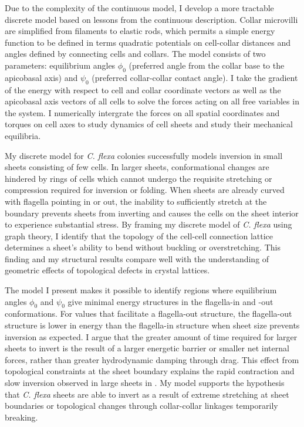 Due to the complexity of the continuous model, I develop a more tractable discrete model based on lessons from the continuous description. 
Collar microvilli are simplified from filaments to elastic rods, which permits a simple energy function to be defined in terms quadratic potentials on cell-collar distances and angles defined by connecting cells and collars.
The model consists of two parameters: equilibrium angles $\phi_0$ (preferred angle from the collar base to the apicobasal axis) and $\psi_0$ (preferred collar-collar contact angle). 
I take the gradient of the energy with respect to cell and collar coordinate vectors as well as the apicobasal axis vectors of all cells to solve the forces acting on all free variables in the system.
I numerically intergrate the forces on all spatial coordinates and torques on cell axes to study dynamics of cell sheets and study their mechanical equilibria.

My discrete model for \textit{C. flexa} colonies successfully models inversion in small sheets consisting of few cells. 
In larger sheets, conformational changes are hindered by rings of cells which cannot undergo the requisite stretching or compression required for inversion or folding. 
When sheets are already curved with flagella pointing in or out, the inability to sufficiently stretch at the boundary prevents sheets from inverting and causes the cells on the sheet interior to experience substantial stress.
By framing my discrete model of \textit{C. flexa} using graph theory, I identify that the topology of the cell-cell connection lattice determines a sheet's ability to bend without buckling or overstretching.
This finding and my structural results compare well with the understanding of geometric effects of topological defects in crystal lattices.

The model I present makes it possible to identify regions where equilibrium angles $\phi_0$ and $\psi_0$ give minimal energy structures in the flagella-in and -out conformations.
For values that facilitate a flagella-out structure, the flagella-out structure is lower in energy than the flagella-in structure when sheet size prevents inversion as expected.
I argue that the greater amount of time required for larger sheets to invert is the result of a larger energetic barrier or smaller net internal forces, rather than greater hydrodynamic damping through drag. 
This effect from topological constraints at the sheet boundary explains the rapid contraction and slow inversion observed in large sheets in \citep{brunet2019}.
My model supports the hypothesis that \textit{C. flexa} sheets are able to invert as a result of extreme stretching at sheet boundaries or topological changes through collar-collar linkages temporarily breaking.
